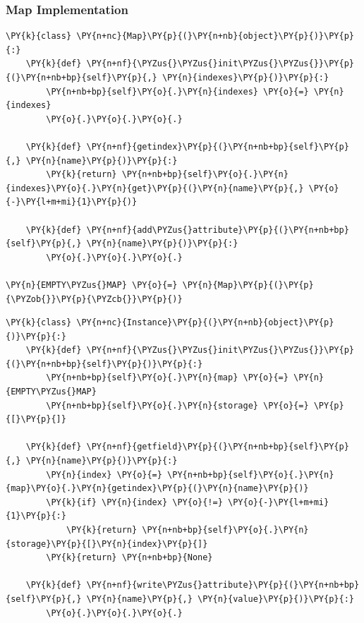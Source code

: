 \documentclass[utf8x]{beamer}
\begin{document}
\begin{frame}[containsverbatim]
\frametitle{Map Implementation}

\begin{Verbatim}[commandchars=\\\{\}]
\PY{k}{class} \PY{n+nc}{Map}\PY{p}{(}\PY{n+nb}{object}\PY{p}{)}\PY{p}{:}
    \PY{k}{def} \PY{n+nf}{\PYZus{}\PYZus{}init\PYZus{}\PYZus{}}\PY{p}{(}\PY{n+nb+bp}{self}\PY{p}{,} \PY{n}{indexes}\PY{p}{)}\PY{p}{:}
        \PY{n+nb+bp}{self}\PY{o}{.}\PY{n}{indexes} \PY{o}{=} \PY{n}{indexes}
        \PY{o}{.}\PY{o}{.}\PY{o}{.}

    \PY{k}{def} \PY{n+nf}{getindex}\PY{p}{(}\PY{n+nb+bp}{self}\PY{p}{,} \PY{n}{name}\PY{p}{)}\PY{p}{:}
        \PY{k}{return} \PY{n+nb+bp}{self}\PY{o}{.}\PY{n}{indexes}\PY{o}{.}\PY{n}{get}\PY{p}{(}\PY{n}{name}\PY{p}{,} \PY{o}{-}\PY{l+m+mi}{1}\PY{p}{)}

    \PY{k}{def} \PY{n+nf}{add\PYZus{}attribute}\PY{p}{(}\PY{n+nb+bp}{self}\PY{p}{,} \PY{n}{name}\PY{p}{)}\PY{p}{:}
        \PY{o}{.}\PY{o}{.}\PY{o}{.}

\PY{n}{EMPTY\PYZus{}MAP} \PY{o}{=} \PY{n}{Map}\PY{p}{(}\PY{p}{\PYZob{}}\PY{p}{\PYZcb{}}\PY{p}{)}
\end{Verbatim}
\end{frame}

\begin{frame}
\begin{Verbatim}[commandchars=\\\{\}]
\PY{k}{class} \PY{n+nc}{Instance}\PY{p}{(}\PY{n+nb}{object}\PY{p}{)}\PY{p}{:}
    \PY{k}{def} \PY{n+nf}{\PYZus{}\PYZus{}init\PYZus{}\PYZus{}}\PY{p}{(}\PY{n+nb+bp}{self}\PY{p}{)}\PY{p}{:}
        \PY{n+nb+bp}{self}\PY{o}{.}\PY{n}{map} \PY{o}{=} \PY{n}{EMPTY\PYZus{}MAP}
        \PY{n+nb+bp}{self}\PY{o}{.}\PY{n}{storage} \PY{o}{=} \PY{p}{[}\PY{p}{]}

    \PY{k}{def} \PY{n+nf}{getfield}\PY{p}{(}\PY{n+nb+bp}{self}\PY{p}{,} \PY{n}{name}\PY{p}{)}\PY{p}{:}
        \PY{n}{index} \PY{o}{=} \PY{n+nb+bp}{self}\PY{o}{.}\PY{n}{map}\PY{o}{.}\PY{n}{getindex}\PY{p}{(}\PY{n}{name}\PY{p}{)}
        \PY{k}{if} \PY{n}{index} \PY{o}{!=} \PY{o}{-}\PY{l+m+mi}{1}\PY{p}{:}
            \PY{k}{return} \PY{n+nb+bp}{self}\PY{o}{.}\PY{n}{storage}\PY{p}{[}\PY{n}{index}\PY{p}{]}
        \PY{k}{return} \PY{n+nb+bp}{None}

    \PY{k}{def} \PY{n+nf}{write\PYZus{}attribute}\PY{p}{(}\PY{n+nb+bp}{self}\PY{p}{,} \PY{n}{name}\PY{p}{,} \PY{n}{value}\PY{p}{)}\PY{p}{:}
        \PY{o}{.}\PY{o}{.}\PY{o}{.}
\end{Verbatim}
\end{frame}
\end{document}
